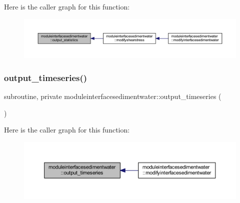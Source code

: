 Here is the caller graph for this function\+:\nopagebreak
\begin{figure}[H]
\begin{center}
\leavevmode
\includegraphics[width=350pt]{namespacemoduleinterfacesedimentwater_aa57d7b6cd225347d61e24202cb55d26b_icgraph}
\end{center}
\end{figure}
\mbox{\label{namespacemoduleinterfacesedimentwater_a8768df3235fac76ac345a9a68b7e7437}} 
\subsubsection{\texorpdfstring{output\+\_\+timeseries()}{output\_timeseries()}}
{\footnotesize\ttfamily subroutine, private moduleinterfacesedimentwater\+::output\+\_\+timeseries (\begin{DoxyParamCaption}{ }\end{DoxyParamCaption})\hspace{0.3cm}{\ttfamily [private]}}

Here is the caller graph for this function\+:\nopagebreak
\begin{figure}[H]
\begin{center}
\leavevmode
\includegraphics[width=350pt]{namespacemoduleinterfacesedimentwater_a8768df3235fac76ac345a9a68b7e7437_icgraph}
\end{center}
\end{figure}
\mbox{\label{namespacemoduleinterfacesedimentwater_a25afe0c9ade674061e39cc5e6456dd28}} 
